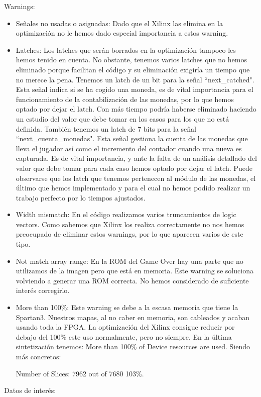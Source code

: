 \documentclass[11pt, a4paper, spanish, openright, twoside]{book}
\begin{document}
	Warnings:
	\begin{itemize}
	\item Señales no usadas o asignadas: Dado que el Xilinx las elimina en la optimización no le hemos dado especial importancia a estos warning.
	\item Latches: Los latches que serán borrados en la optimización tampoco les hemos tenido en cuenta. No obstante, tenemos varios latches que no hemos eliminado porque 
	facilitan el código y su eliminación exigiría un tiempo que no merece la pena.	Tenemos un latch de un bit para la señal ``next\_catched". Esta señal indica si se ha cogido una moneda,
	es de vital importancia para el funcionamiento de la contabilización de las monedas, por lo que hemos optado por dejar el latch. Con más tiempo podría haberse eliminado haciendo un 
	estudio del valor que debe tomar en los casos para los que no está definida.	También tenemos un latch de 7 bits para la señal ``next\_cuenta\_monedas". Esta señal gestiona
	 la cuenta de las monedas que lleva el jugador así como el incremento del contador cuando una nueva es capturada. Es de vital importancia, y ante la falta de un análisis detallado
	del valor que debe tomar para cada caso  hemos optado por dejar el latch. Puede observarse que los latch que tenemos pertenecen al módulo de las monedas, el último
	 que hemos implementado y para el cual no hemos podido realizar un trabajo perfecto por lo tiempos ajustados.	
	\item Width mismatch: En el código realizamos varios truncamientos de logic vectors. Como sabemos que Xilinx los realiza correctamente no nos hemos preocupado de eliminar
	estos warnings, por lo que aparecen varios de este tipo.
	\item Not match array range: En la ROM del Game Over hay una parte que no utilizamos de la imagen pero que está en memoria. Este warning se soluciona volviendo a generar una ROM correcta.
	 No hemos considerado de suficiente interés corregirlo.
	\item More than 100\%: Este warning se debe a la escasa memoria que tiene la Spartan3. Nuestros mapas, al no caber en memoria, son cableados y acaban usando toda la FPGA. La optimización del Xilinx 
	consigue reducir por debajo del 100\% este uso normalmente, pero no siempre. En la última sintetización tenemos: More than 100\% of Device resources are used. Siendo más concretos:	
	
	Number of Slices:  7962  out of   7680   103\%. 
\end{itemize}
	Datos de interés:
\end{document}
